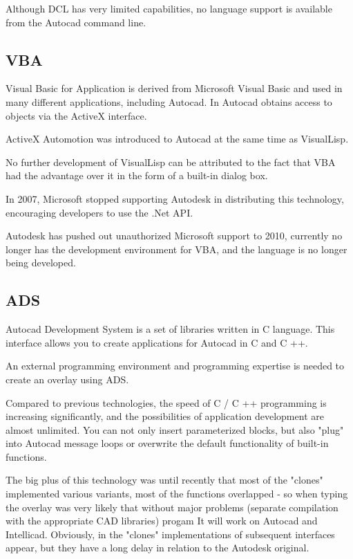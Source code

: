 \documentclass[a4paper, 11pt, article]{report}
\begin{document}
Although DCL has very limited capabilities, no language support is available from the Autocad command line.

\subsection{VBA}

Visual Basic for Application is derived from Microsoft Visual Basic and used in many different applications, including Autocad. In Autocad obtains access to objects via the ActiveX interface.

ActiveX Automotion was introduced to Autocad at the same time as VisualLisp.

No further development of VisualLisp can be attributed to the fact that VBA had the advantage over it in the form of a built-in dialog box.

In 2007, Microsoft stopped supporting Autodesk in distributing this technology, encouraging developers to use the .Net API.

Autodesk has pushed out unauthorized Microsoft support to 2010, currently no longer has the development environment for VBA, and the language is no longer being developed.

\subsection{ADS}

Autocad Development System is a set of libraries written in C language. This interface allows you to create applications for Autocad in C and C ++.

An external programming environment and programming expertise is needed to create an overlay using ADS.

Compared to previous technologies, the speed of C / C ++ programming is increasing significantly, and the possibilities of application development are almost unlimited. You can not only insert parameterized blocks, but also "plug" into Autocad message loops or overwrite the default functionality of built-in functions.

The big plus of this technology was until recently that most of the "clones" implemented various variants, most of the functions overlapped - so when typing the overlay was very likely that without major problems (separate compilation with the appropriate CAD libraries) progam It will work on Autocad and Intellicad. Obviously, in the "clones" implementations of subsequent interfaces appear, but they have a long delay in relation to the Autodesk original.
\end{document}
